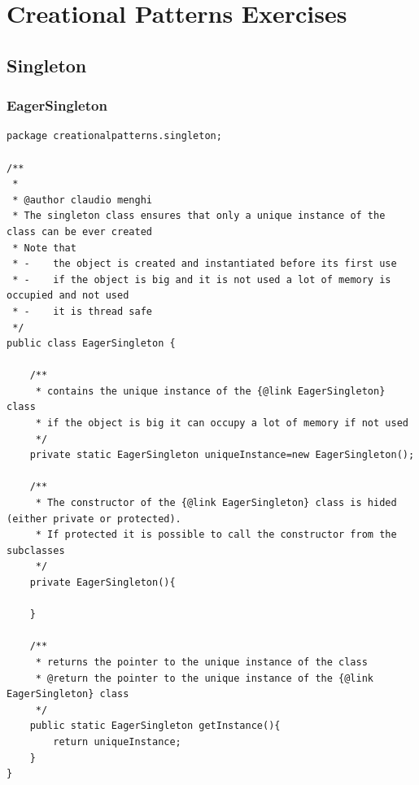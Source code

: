 \documentclass{article}
\begin{document}
\section{Creational Patterns Exercises}
\subsection{Singleton}

\subsubsection{EagerSingleton}
\begin{lstlisting}
package creationalpatterns.singleton;

/**
 * 
 * @author claudio menghi
 * The singleton class ensures that only a unique instance of the class can be ever created
 * Note that 
 * -	the object is created and instantiated before its first use
 * -	if the object is big and it is not used a lot of memory is occupied and not used
 * -	it is thread safe
 */
public class EagerSingleton {

	/**
	 * contains the unique instance of the {@link EagerSingleton} class
	 * if the object is big it can occupy a lot of memory if not used
	 */
	private static EagerSingleton uniqueInstance=new EagerSingleton();
	
	/**
	 * The constructor of the {@link EagerSingleton} class is hided (either private or protected). 
	 * If protected it is possible to call the constructor from the subclasses 
	 */
	private EagerSingleton(){
		
	}
	
	/**
	 * returns the pointer to the unique instance of the class
	 * @return the pointer to the unique instance of the {@link EagerSingleton} class
	 */
	public static EagerSingleton getInstance(){
		return uniqueInstance;
	}
}
\end{lstlisting}
\end{document}
